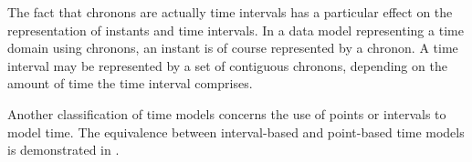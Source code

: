 The fact that chronons are actually time intervals has a particular effect on the representation of instants and time intervals. In a data model representing a time domain using chronons, an instant is of course represented by a chronon. A time interval may be represented by a set of contiguous chronons, depending on the amount of time the time interval comprises.



Another classification of time models concerns the use of points or intervals to model time. The equivalence between interval-based and point-based time models is demonstrated in \cite{Bohlen1998}.



